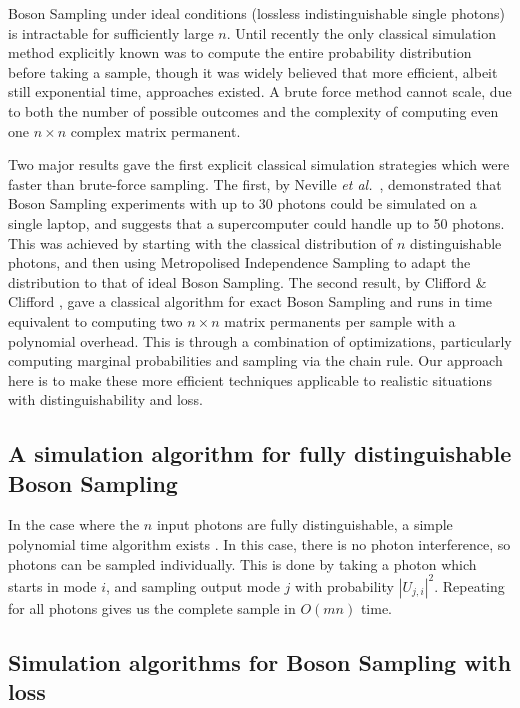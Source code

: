 Boson Sampling under ideal conditions (lossless indistinguishable single photons) is intractable for sufficiently large $n$. 
Until recently the only classical simulation method explicitly known was to compute the entire probability distribution before taking a sample, though it was widely believed that more efficient, albeit still exponential time, approaches existed. 
A brute force method cannot scale, due to both the number of possible outcomes and the complexity of computing even one $n\times n$ complex matrix permanent.

Two major results gave the first explicit classical simulation strategies which were faster than brute-force sampling. 
The first, by Neville \textit{et al.}~\cite{neville2017}, demonstrated that Boson Sampling experiments with up to 30 photons could be simulated on a single laptop, and suggests that a supercomputer could handle up to 50 photons. 
This was achieved by starting with the classical distribution of $n$ distinguishable photons, and then using Metropolised Independence Sampling to adapt the distribution to that of ideal Boson Sampling.
The second result, by Clifford \& Clifford \cite{clifford2017}, gave a classical algorithm for exact Boson Sampling and runs in time equivalent to computing two $n \times n$ matrix  permanents per sample with a polynomial overhead. 
This is through a combination of optimizations, particularly computing marginal probabilities and sampling via the chain rule.
Our approach here is to make these more efficient techniques applicable to realistic situations with distinguishability and loss.

\subsection{A simulation algorithm for fully distinguishable Boson Sampling}
\label{ssec:fully-dist-sim}

In the case where the $n$ input photons are fully distinguishable, a simple polynomial time algorithm exists \cite{aaronson2014}. In this case, there is no photon interference, so photons can be sampled individually. This is done by taking a photon which starts in mode $i$, and sampling output mode $j$ with probability $|U_{j,i}|^2$. Repeating for all photons gives us the complete sample in $O(mn)$ time.

\subsection{Simulation algorithms for Boson Sampling with loss}

